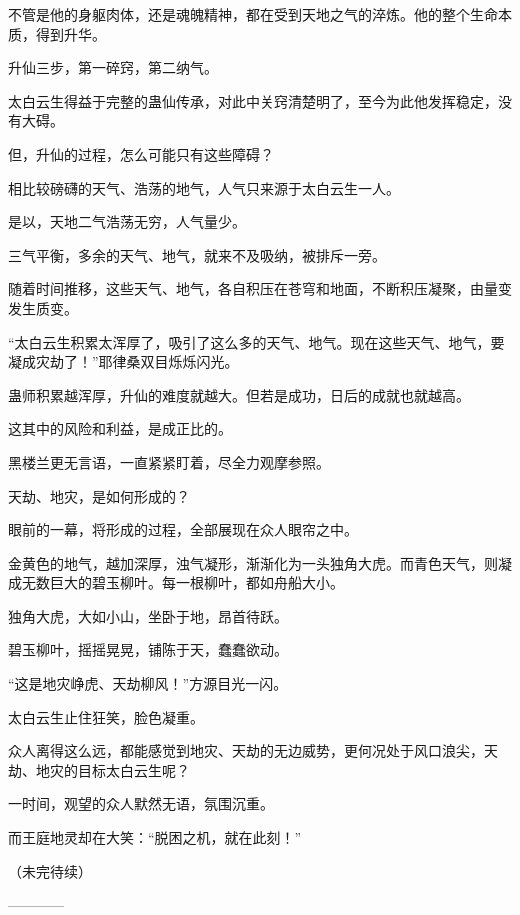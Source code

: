 \begin{this_body}
不管是他的身躯肉体，还是魂魄精神，都在受到天地之气的淬炼。他的整个生命本质，得到升华。

升仙三步，第一碎窍，第二纳气。

太白云生得益于完整的蛊仙传承，对此中关窍清楚明了，至今为此他发挥稳定，没有大碍。

但，升仙的过程，怎么可能只有这些障碍？

相比较磅礴的天气、浩荡的地气，人气只来源于太白云生一人。

是以，天地二气浩荡无穷，人气量少。

三气平衡，多余的天气、地气，就来不及吸纳，被排斥一旁。

随着时间推移，这些天气、地气，各自积压在苍穹和地面，不断积压凝聚，由量变发生质变。

“太白云生积累太浑厚了，吸引了这么多的天气、地气。现在这些天气、地气，要凝成灾劫了！”耶律桑双目烁烁闪光。

蛊师积累越浑厚，升仙的难度就越大。但若是成功，日后的成就也就越高。

这其中的风险和利益，是成正比的。

黑楼兰更无言语，一直紧紧盯着，尽全力观摩参照。

天劫、地灾，是如何形成的？

眼前的一幕，将形成的过程，全部展现在众人眼帘之中。

金黄色的地气，越加深厚，浊气凝形，渐渐化为一头独角大虎。而青色天气，则凝成无数巨大的碧玉柳叶。每一根柳叶，都如舟船大小。

独角大虎，大如小山，坐卧于地，昂首待跃。

碧玉柳叶，摇摇晃晃，铺陈于天，蠢蠢欲动。

“这是地灾峥虎、天劫柳风！”方源目光一闪。

太白云生止住狂笑，脸色凝重。

众人离得这么远，都能感觉到地灾、天劫的无边威势，更何况处于风口浪尖，天劫、地灾的目标太白云生呢？

一时间，观望的众人默然无语，氛围沉重。

而王庭地灵却在大笑：“脱困之机，就在此刻！”

（未完待续）

------------

\end{this_body}

